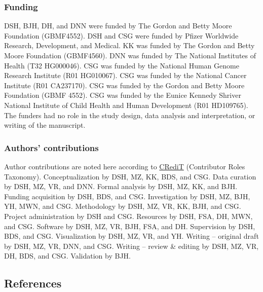 \hypertarget{funding}{%
\subsubsection{Funding}\label{funding}}

DSH, BJH, DH, and DNN were funded by The Gordon and Betty Moore Foundation (GBMF4552).
DSH and CSG were funded by Pfizer Worldwide Research, Development, and Medical.
KK was funded by The Gordon and Betty Moore Foundation (GBMF4560).
DNN was funded by The National Institutes of Health (T32 HG000046).
CSG was funded by the National Human Genome Research Institute (R01 HG010067).
CSG was funded by the National Cancer Institute (R01 CA237170).
CSG was funded by the Gordon and Betty Moore Foundation (GBMF 4552).
CSG was funded by the Eunice Kennedy Shriver National Institute of Child Health and Human Development (R01 HD109765).
The funders had no role in the study design, data analysis and interpretation, or writing of the manuscript.

\hypertarget{authors-contributions}{%
\subsubsection{Authors' contributions}\label{authors-contributions}}

Author contributions are noted here according to \href{https://credit.niso.org/}{CRediT} (Contributor Roles Taxonomy).
Conceptualization by DSH, MZ, KK, BDS, and CSG.
Data curation by DSH, MZ, VR, and DNN.
Formal analysis by DSH, MZ, KK, and BJH.
Funding acquisition by DSH, BDS, and CSG.
Investigation by DSH, MZ, BJH, YH, MWN, and CSG.
Methodology by DSH, MZ, VR, KK, BJH, and CSG.
Project administration by DSH and CSG.
Resources by DSH, FSA, DH, MWN, and CSG.
Software by DSH, MZ, VR, BJH, FSA, and DH.
Supervision by DSH, BDS, and CSG.
Visualization by DSH, MZ, VR, and YH.
Writing -- original draft by DSH, MZ, VR, DNN, and CSG.
Writing -- review \& editing by DSH, MZ, VR, DH, BDS, and CSG.
Validation by BJH.

\hypertarget{references}{%
\subsection{References}\label{references}}

